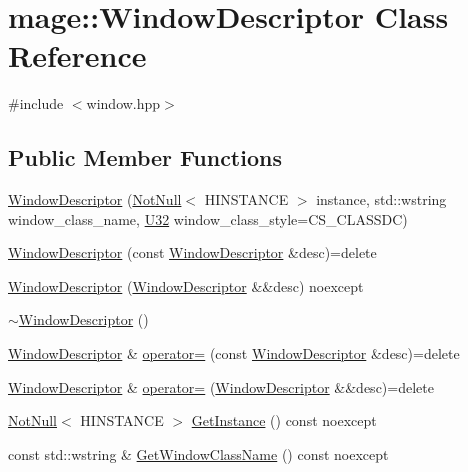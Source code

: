\hypertarget{classmage_1_1_window_descriptor}{}\section{mage\+:\+:Window\+Descriptor Class Reference}
\label{classmage_1_1_window_descriptor}


{\ttfamily \#include $<$window.\+hpp$>$}

\subsection*{Public Member Functions}
\begin{DoxyCompactItemize}
\item 
\mbox{\hyperlink{classmage_1_1_window_descriptor_a3c0f82aaea1ac634e0001e2bdf1484ab}{Window\+Descriptor}} (\mbox{\hyperlink{namespacemage_a8769f9d670d6b585ea306cb1062af94b}{Not\+Null}}$<$ H\+I\+N\+S\+T\+A\+N\+CE $>$ instance, std\+::wstring window\+\_\+class\+\_\+name, \mbox{\hyperlink{namespacemage_aa5d6eaabaac3cdd01873d6a3d27e90f3}{U32}} window\+\_\+class\+\_\+style=C\+S\+\_\+\+C\+L\+A\+S\+S\+DC)
\item 
\mbox{\hyperlink{classmage_1_1_window_descriptor_a98059ff14fd8c0e808d1a15dbf9b6bb8}{Window\+Descriptor}} (const \mbox{\hyperlink{classmage_1_1_window_descriptor}{Window\+Descriptor}} \&desc)=delete
\item 
\mbox{\hyperlink{classmage_1_1_window_descriptor_a9c63bbf4c794efd0e6dbc067d3378ccd}{Window\+Descriptor}} (\mbox{\hyperlink{classmage_1_1_window_descriptor}{Window\+Descriptor}} \&\&desc) noexcept
\item 
\mbox{\hyperlink{classmage_1_1_window_descriptor_ac73160dd1e90b9acf819164b774d5709}{$\sim$\+Window\+Descriptor}} ()
\item 
\mbox{\hyperlink{classmage_1_1_window_descriptor}{Window\+Descriptor}} \& \mbox{\hyperlink{classmage_1_1_window_descriptor_a539433423c905e8b45d5bc9d895ee79c}{operator=}} (const \mbox{\hyperlink{classmage_1_1_window_descriptor}{Window\+Descriptor}} \&desc)=delete
\item 
\mbox{\hyperlink{classmage_1_1_window_descriptor}{Window\+Descriptor}} \& \mbox{\hyperlink{classmage_1_1_window_descriptor_a314e45a7cac3a68caefd8b05ddc86040}{operator=}} (\mbox{\hyperlink{classmage_1_1_window_descriptor}{Window\+Descriptor}} \&\&desc)=delete
\item 
\mbox{\hyperlink{namespacemage_a8769f9d670d6b585ea306cb1062af94b}{Not\+Null}}$<$ H\+I\+N\+S\+T\+A\+N\+CE $>$ \mbox{\hyperlink{classmage_1_1_window_descriptor_a09423845e3cc6bd451e280a92222ca14}{Get\+Instance}} () const noexcept
\item 
const std\+::wstring \& \mbox{\hyperlink{classmage_1_1_window_descriptor_aeb9db711e495a075146d322978de593e}{Get\+Window\+Class\+Name}} () const noexcept
\end{DoxyCompactItemize}
